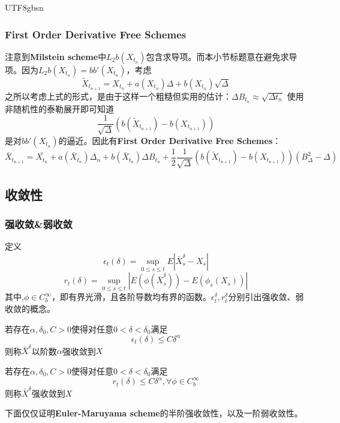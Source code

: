 \documentclass{article}
\begin{document}
\begin{CJK*}{UTF8}{gbsn}
\subsubsection{First Order Derivative Free Schemes}
注意到\textbf{Milstein scheme}中$L_2b(X_{t_n})$包含求导项。而本小节标题意在避免求导项。因为$L_2b(X_{t_n})=bb'(X_{t_n})$，考虑
$$
\tilde{X}_{t_{n+1}}=X_{t_n}+a(X_{t_n})\Delta+b(X_{t_n})\sqrt{\Delta}
$$
之所以考虑上式的形式，是由于这样一个粗糙但实用的估计：$\Delta B_{t_n}\approx\sqrt{\Delta t_{n}}$
使用非随机性的泰勒展开即可知道
$$
\frac{1}{\sqrt{\Delta}}\left(b(\tilde{X}_{t_{n+1}})-b({X}_{t_{n+1}})\right)$$
是对$bb'(X_{t_n})$的逼近。因此有\textbf{First Order Derivative Free Schemes}：
$$
\bar{X}_{t_{n+1}}=\bar{X_{t_n}}+a(\bar{X}_{t_{n}})\Delta_n+b(\bar{X}_{t_{n}})\Delta B_{t_n}+\frac{1}{2}\frac{1}{\sqrt{\Delta}}\left(b(\tilde{X}_{t_{n+1}})-b({X}_{t_{n+1}})\right)(B_\Delta^2-\Delta)    
$$
\subsection{收敛性}
\subsubsection{强收敛\&弱收敛}
定义
$$
\epsilon_{t}(\delta)=\sup_{0\leq s\leq t}E|\bar{X}_{s}^{\delta}-X_{s}|
$$
$$
r_{t}(\delta)=\sup_{0\le s\le t}\left|E(\phi(\bar{X}_{s}^{\delta}))-E(\phi_{s}({X}_{s}))\right|
$$
其中,$\phi\in C_b^\infty$，即有界光滑，且各阶导数均有界的函数。$\epsilon_{t}^{\delta},r_{t}^{\delta}$分别引出强收敛、弱收敛的概念。
\begin{definition}[强收敛]
    若存在$\alpha,\delta_0,C>0$使得对任意$0<\delta<\delta_0$满足
    $$
    \epsilon_{t}(\delta)\le C\delta^\alpha
    $$
    则称$\bar{X}^\delta$以阶数$\alpha$强收敛到$X$
\end{definition}

\begin{definition}[弱收敛]
    若存在$\alpha,\delta_0,C>0$使得对任意$0<\delta<\delta_0$满足
    $$
    r_{t}(\delta)\le C\delta^\alpha,\forall\phi\in C_b^\infty
    $$
    则称$\bar{X}^\delta$强收敛到$X$
\end{definition}
下面仅仅证明\textbf{Euler-Maruyama scheme}的半阶强收敛性，以及一阶弱收敛性。

\end{CJK*}
\end{document}
